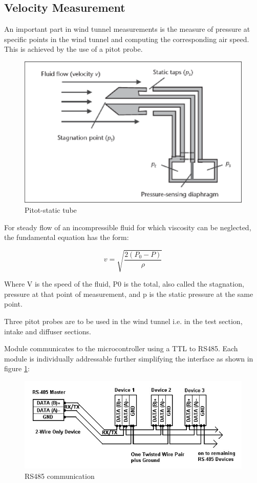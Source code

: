  
\subsection{Velocity Measurement}
An important part in wind tunnel measurements is the measure of pressure at specific points in the wind tunnel and computing the corresponding air speed. This is achieved by the use of a pitot probe. 
\begin{center}
\begin{figure}[H]
\centering
\includegraphics[width=0.6\linewidth]{Figures/pitot}
\caption[Pitot-static tube]{Pitot-static tube \cite{viquerat_continuous_2006}}
\end{figure}
\end{center}
For steady flow of an incompressible fluid for which viscosity can be neglected, the fundamental equation has the form:

\begin{equation}
	v = \sqrt{\frac{2(P_{0} - P)}{\rho}}
\end{equation}

Where V is the speed of the fluid, P0 is the total, also called the stagnation, pressure at that point of measurement, and p is the static pressure at the same point.

Three pitot probes are to be used in the wind tunnel i.e. in the test section, intake and diffuser sections.
                                                                                                                                                                   
Module communicates to the microcontroller using a TTL to RS485. Each module is individually addressable further simplifying the interface as shown in figure \ref{fig:rs485}:
\begin{center}
\begin{figure}[H]
\centering
\includegraphics{Figures/modbus}
\caption[RS485 communication]{RS485 communication}
\label{fig:rs485}
\end{figure}
\end{center}

